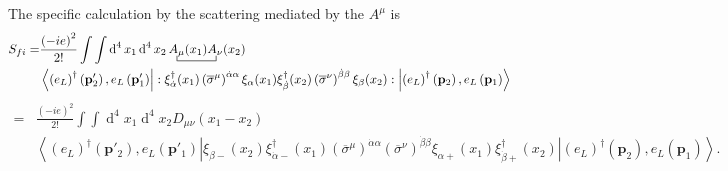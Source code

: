 The specific calculation by the scattering mediated by the $A^{\mu}$ is 
\begin{align}
  S_{fi}=&\frac{\left( -ie \right)^{2}}{2!}\int\int \operatorname{d}^4x_1 \operatorname{d}^4x_2
\bcontraction{\,}{A_{\mu}}{(x_1)}{A_{\nu}}\,A_{\mu}(x_1)A_{\nu}(x_2) \nonumber\\
&\left\langle \left(e_L\right)^{\dagger} \left(\mathbf{p}'_2\right),e_L\left(\mathbf{p}'_1\right) \right|
  : \xi^{\dagger}_{\dot{\alpha}}(x_1)\left( \overline{\sigma}^{\mu} \right)^{\dot{\alpha}\alpha}\xi_{\alpha}(x_1)\xi^{\dagger}_{\dot{\beta}}(x_2)\left( \overline{\sigma}^{\nu} \right)^{\dot{\beta}\beta}\xi_{\beta}(x_2):
 \left| \left(e_L\right)^{\dagger}\left(\mathbf{p}_2\right) ,e_L \left(\mathbf{p}_1\right)  \right\rangle \nonumber\\
\end{align}
\begin{align}
  =&\frac{\left( -ie \right)^{2}}{2!}\int\int \operatorname{d}^4x_1 \operatorname{d}^4x_2
D_{\mu\nu} \left( x_1-x_2 \right)\nonumber\\
&\left\langle \left(e_L\right)^{\dagger} \left(\mathbf{p}'_2\right),e_L\left(\mathbf{p}'_1\right)\right|
   \xi_{\beta -}(x_2)\xi^{\dagger}_{\dot{\alpha} -}(x_1)\left( \overline{\sigma}^{\mu} \right)^{\dot{\alpha}\alpha}\left( \overline{\sigma}^{\nu} \right)^{\dot{\beta}\beta}\xi_{\alpha +}(x_1)\xi^{\dagger}_{\dot{\beta}+}(x_2)
 \left| \left(e_L\right)^{\dagger}\left(\mathbf{p}_2\right), e_L \left(\mathbf{p}_1\right)\right\rangle. 
\end{align}

